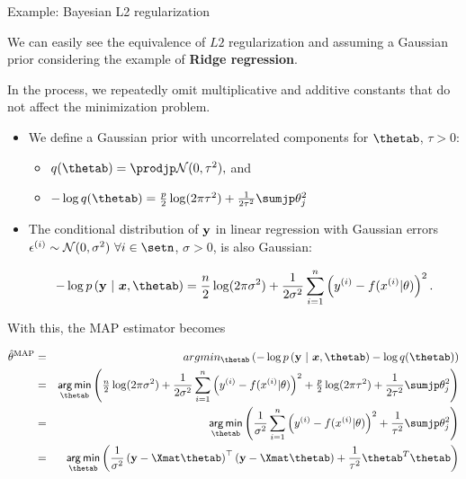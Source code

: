 \begin{vbframe}{Example: Bayesian L2 regularization}

\small

We can easily see the equivalence of $L2$ regularization and assuming a Gaussian
prior considering the example of \textbf{Ridge regression}.

\vfill

In the process, we repeatedly omit multiplicative and additive constants that 
do not affect the minimization problem.

\vfill

\begin{itemize}

  \small
  \item We define a Gaussian prior with uncorrelated components for $\thetab$, 
  $\tau > 0$:
  \begin{itemize}
    \footnotesize
    \item $q(\thetab) = \prodjp \mathcal{N}(0, \tau^2),$ and 
    \item $- \log q(\thetab) = \frac{p}{2} \log(2\pi \tau^2) + \frac{1}{2\tau^2} 
    \sumjp \theta_j^2$
  \end{itemize}
  
  \item The conditional distribution of $\mathbf{y}$ in linear regression with 
  Gaussian errors $\epsilon^{(i)} \sim \mathcal{N}(0, \sigma^2) ~ \forall i \in 
  \setn$, $\sigma > 0$, is also Gaussian: 
  \begin{footnotesize}
  $$- \log p\left(\ydat ~|~ \xv, \thetab\right) = \frac{n}{2} \log (2\pi 
  \sigma^2) + \frac{1}{2\sigma^2} \sumin \left(\yi - \fxit \right)^2.$$
  \end{footnotesize}
  
\end{itemize}

\framebreak
\footnotesize

With this, the MAP estimator becomes

\begin{scriptsize}

\begin{eqnarray*}
\thetah^{\text{MAP}} &=& argmin_{\thetab} \left(
- \log p\left(\ydat ~|~ \xv, \thetab\right) - \log q(\thetab)
\right) \\
&=& \argmin_{\thetab} \Bigg(
\tfrac{n}{2} \log (2\pi \sigma^2) + \frac{1}{2\sigma^2} \sumin \left(\yi - 
\fxit \right)^2 + \tfrac{p}{2} \log(2\pi \tau^2) + 
\frac{1}{2\tau^2} \sumjp \theta_j^2
\Bigg) \\
&=& \argmin_{\thetab} \left( \frac{1}{\sigma^2} \sumin \left(\yi -
\fxit \right)^2 + \frac{1}{\tau^2} \sumjp \theta_j^2 \right) \\
&=& \argmin_{\thetab} \left(
\frac{1}{\sigma^2} \left(\ydat - \Xmat \thetab\right)^\top \left(\ydat - \Xmat
\thetab\right) + \frac{1}{\tau^2} {\thetab}^T\thetab
\right)
\end{eqnarray*}


\end{scriptsize}
\end{vbframe}
